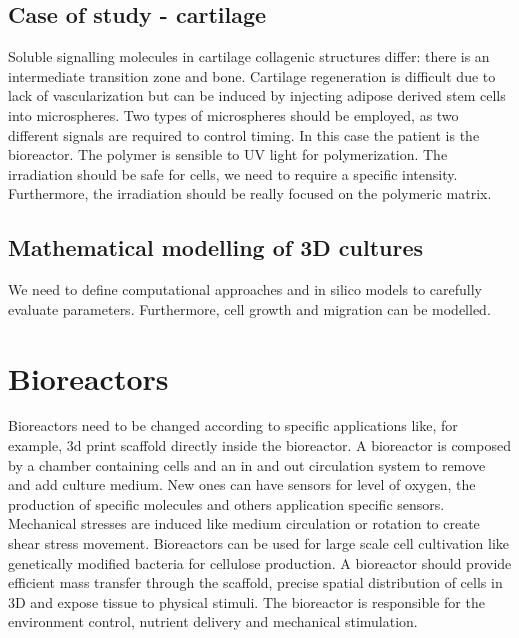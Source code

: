 	\subsection{Case of study - cartilage}
	Soluble signalling molecules in cartilage collagenic structures differ: there is an intermediate transition zone and bone.
	Cartilage regeneration is difficult due to lack of vascularization but can be induced by injecting adipose derived stem cells into microspheres.
	Two types of microspheres should be employed, as two different signals are required to control timing.
	In this case the patient is the bioreactor.
	The polymer is sensible to UV light for polymerization.
	The irradiation should be safe for cells, we need to require a specific intensity.
	Furthermore, the irradiation should be really focused on the polymeric matrix.

	\subsection{Mathematical modelling of 3D cultures}
	We need to define computational approaches and in silico models to carefully evaluate parameters.
	Furthermore, cell growth and migration can be modelled.

\section{Bioreactors}
Bioreactors need to be changed according to specific applications like, for example, 3d print scaffold directly inside the bioreactor.
A bioreactor is composed by a chamber containing cells and an in and out circulation system to remove and add culture medium.
New ones can have sensors for level of oxygen, the production of specific molecules and others application specific sensors.
Mechanical stresses are induced like medium circulation or rotation to create shear stress movement.
Bioreactors can be used for large scale cell cultivation like genetically modified bacteria for cellulose production.
A bioreactor should provide efficient mass transfer through the scaffold, precise spatial distribution of cells in 3D and expose tissue to physical stimuli.
The bioreactor is responsible for the environment control, nutrient delivery and mechanical stimulation.
